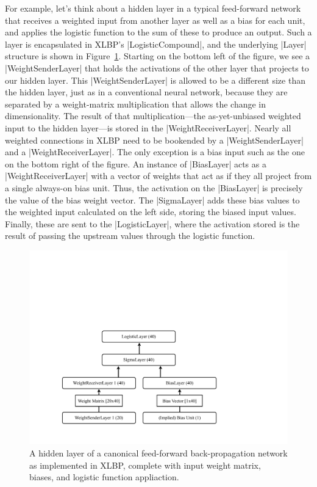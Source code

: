 \documentclass{article}
\newcommand{\figref}[1]{Figure~\ref{#1}}
\begin{document}
For example, let's think about a hidden layer in a typical feed-forward network that receives a weighted input from another layer as well as a bias for each unit, and
applies the logistic function to the sum of these to produce an output. Such a layer is encapsulated
in XLBP's |LogisticCompound|, and the underlying |Layer| structure is shown in
\figref{fig-hidden}. Starting on the bottom left of the figure, we see a 
|WeightSenderLayer| that holds the activations of the other layer that projects to our
hidden layer. This |WeightSenderLayer| is allowed to be a different size than the hidden
layer, just as in a conventional neural network, because they are separated by a weight-matrix
multiplication that allows the change in dimensionality. The result of that multiplication---the 
as-yet-unbiased weighted input to the hidden layer---is stored in the 
|WeightReceiverLayer|. Nearly all weighted connections in XLBP need to be bookended by a
|WeightSenderLayer| and a |WeightReceiverLayer|. The only exception is a bias
input such as the one on the bottom right of the figure. An instance of |BiasLayer| acts
as a |WeightReceiverLayer| with a vector of weights that act as if they all project from 
a single always-on bias unit. Thus, the activation on the |BiasLayer| is precisely the
value of the bias weight vector. The |SigmaLayer| adds these bias values to the weighted
input calculated on the left side, storing the biased input values. Finally, these are sent to the
|LogisticLayer|, where the activation stored is the result of passing the upstream values
through the logistic function.

\begin{figure}
\centering
\includegraphics[width=0.6\linewidth]{hidden.pdf}
\caption{A hidden layer of a canonical feed-forward back-propagation network as implemented in XLBP, complete with input weight matrix, biases, and logistic function appliaction.}
\label{fig-hidden}
\end{figure}
\end{document}
